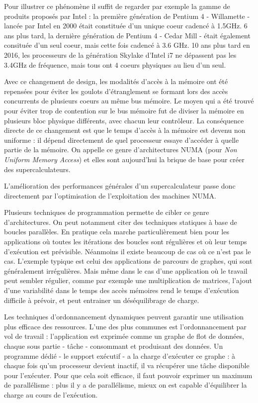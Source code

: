 Pour illustrer ce phénomène il suffit de regarder par exemple la gamme de produits proposés par Intel : la première génération de Pentium 4 - Willamette - lancée par Intel en 2000 était constituée d'un unique coeur cadencé à 1.5GHz. 6 ans plus tard, la dernière génération de Pentium 4 - Cedar Mill - était également consituée d'un seul coeur, mais cette fois cadencé à 3.6 GHz. 10 ans plus tard en 2016, les processeurs de la génération Skylake d'Intel i7 ne dépassent pas les 3.4GHz de fréquence, mais tous ont 4 coeurs physiques au lieu d'un seul.

Avec ce changement de design, les modalités d'accès à la mémoire ont été repensées pour éviter les goulots d'étranglement se formant lors des accès concurrents de plusieurs coeurs au même bus mémoire. Le moyen qui a été trouvé pour éviter trop de contention sur le bus mémoire fut de diviser la mémoire en plusieurs bloc physique différents, avec chacun leur contrôleur.
La conséquence directe de ce changement est que le temps d'accès à la mémoire est devenu non uniforme : il dépend directement de quel processeur essaye d'accéder à quelle partie de la mémoire.
On appelle ce genre d'architectures NUMA (pour \emph{Non Uniform Memory Access}) et elles sont aujourd'hui la brique de base pour créer des supercalculateurs.

L'amélioration des performances générales d'un supercalculateur passe donc directement par l'optimisation de l'exploitation des machines NUMA.

Plusieurs techniques de programmation permette de cibler ce genre d'architectures.
On peut notamment citer des techniques statiques à base de boucles parallèles.
En pratique cela marche particulièrement bien pour les applications où toutes les itérations des boucles sont régulières et où leur temps d'exécution est prévisible.
Néanmoins il existe beaucoup de cas où ce n'est pas le cas.
L'exemple typique est celui des applications de parcours de graphes, qui sont généralement irrégulières.
Mais même dans le cas d'une application où le travail peut sembler régulier, comme par exemple une multiplication de matrices, l'ajout d'une variabilité dans le temps des accès mémoires rend le temps d'exécution difficile à prévoir, et peut entrainer un déséquilibrage de charge.


Les techniques d'ordonnancement dynamiques peuvent garantir une utilisation plus efficace des ressources.
L'une des plus communes est l'ordonnancement par vol de travail : l'application est exprimée comme un graphe de flot de données, chaque sous partie - tâche - consommant et produisant des données.
Un programme dédié - le support exécutif - a la charge d'exécuter ce graphe : à chaque fois qu'un processeur devient inactif, il va récupérer une tâche disponible pour l'exécuter.
Pour que cela soit efficace, il faut pouvoir exprimer un maximum de parallélisme : plus il y a de parallélisme, mieux on est capable d'équilibrer la charge au cours de l'exécution.

